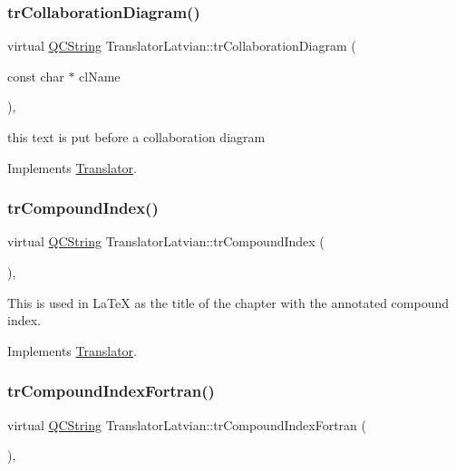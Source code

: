 \subsubsection{\texorpdfstring{trCollaborationDiagram()}{trCollaborationDiagram()}}
{\footnotesize\ttfamily virtual \mbox{\hyperlink{class_q_c_string}{Q\+C\+String}} Translator\+Latvian\+::tr\+Collaboration\+Diagram (\begin{DoxyParamCaption}\item[{const char $\ast$}]{cl\+Name }\end{DoxyParamCaption})\hspace{0.3cm}{\ttfamily [inline]}, {\ttfamily [virtual]}}

this text is put before a collaboration diagram 

Implements \mbox{\hyperlink{class_translator}{Translator}}.

\mbox{\label{class_translator_latvian_a2670f6b5d525f66b012bc3a5d5723708}} 
\subsubsection{\texorpdfstring{trCompoundIndex()}{trCompoundIndex()}}
{\footnotesize\ttfamily virtual \mbox{\hyperlink{class_q_c_string}{Q\+C\+String}} Translator\+Latvian\+::tr\+Compound\+Index (\begin{DoxyParamCaption}{ }\end{DoxyParamCaption})\hspace{0.3cm}{\ttfamily [inline]}, {\ttfamily [virtual]}}

This is used in La\+TeX as the title of the chapter with the annotated compound index. 

Implements \mbox{\hyperlink{class_translator}{Translator}}.

\mbox{\label{class_translator_latvian_a73c04162ecd8c06cccee4129cd63d633}} 
\subsubsection{\texorpdfstring{trCompoundIndexFortran()}{trCompoundIndexFortran()}}
{\footnotesize\ttfamily virtual \mbox{\hyperlink{class_q_c_string}{Q\+C\+String}} Translator\+Latvian\+::tr\+Compound\+Index\+Fortran (\begin{DoxyParamCaption}{ }\end{DoxyParamCaption})\hspace{0.3cm}{\ttfamily [inline]}, {\ttfamily [virtual]}}

